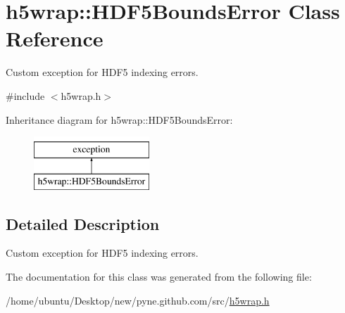 \hypertarget{classh5wrap_1_1_h_d_f5_bounds_error}{}\section{h5wrap\+:\+:H\+D\+F5\+Bounds\+Error Class Reference}
\label{classh5wrap_1_1_h_d_f5_bounds_error}


Custom exception for H\+D\+F5 indexing errors.  




{\ttfamily \#include $<$h5wrap.\+h$>$}

Inheritance diagram for h5wrap\+:\+:H\+D\+F5\+Bounds\+Error\+:\begin{figure}[H]
\begin{center}
\leavevmode
\includegraphics[height=2.000000cm]{classh5wrap_1_1_h_d_f5_bounds_error}
\end{center}
\end{figure}


\subsection{Detailed Description}
Custom exception for H\+D\+F5 indexing errors. 

The documentation for this class was generated from the following file\+:\begin{DoxyCompactItemize}
\item 
/home/ubuntu/\+Desktop/new/pyne.\+github.\+com/src/\hyperlink{h5wrap_8h}{h5wrap.\+h}\end{DoxyCompactItemize}
